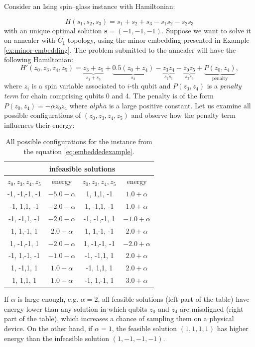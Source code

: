 \begin{example}
Consider an Ising spin--glass instance with Hamiltonian:

\begin{equation}
H(s_1, s_2, s_3) = s_1 + s_2 + s_3 - s_1s_2 - s_2s_3
\end{equation}
with an unique optimal solution $\mathbf{s} = (-1, -1, -1)$. Suppose we want to solve it on annealer
with $C_1$ topology, using the minor embedding presented in Example \ref{ex:minor-embedding}. The
problem submitted to the annealer will have the following Hamiltonian:
\begin{equation}
  H'(z_0, z_3, z_4, z_5) = \underbrace{z_3 + z_5}_{s_1 + s_3} + \underbrace{0.5(z_0 + z_4)}_{s_2} - \underbrace{z_3z_4}_{s_2s_1} - \underbrace{z_0z_5}_{s_2s_3} + \underbrace{P(z_0, z_4)}_{\text{penalty}},
  \label{eq:embeddedexample}
\end{equation}
where $z_i$ is a spin variable associated to $i$-th qubit and $P(z_0, z_4)$ is a \emph{penalty term}
for chain comprising qubits 0 and 4. The penalty is of the form $P(z_0, z_4) = -\alpha z_0z_4$ where
$alpha$ is a large positive constant. Let us examine all possible configurations of $(z_0, z_3, z_4,
z_5)$ and observe how the penalty term influences their energy:
\begin{table}[h]
\centering
\begin{tabular}{|c|c|c|c|}
\hline
\rowcolor{theader} \multicolumn{2}{|c|}{feasible solutions} & \multicolumn{2}{c|}{infeasible solutions} \\
\hline
\rowcolor{tsubheader} $z_0, z_3, z_4, z_5$ & energy & $z_0, z_3, z_4, z_5$ & energy\\
\hline
-1, -1,-1, -1 & $-5.0 -\alpha$ & 1, 1,1, -1 & $1.0 + \alpha$\\
-1, 1,1, -1 & $-2.0 -\alpha$ & 1, -1,1, -1 & $1.0 + \alpha$\\
-1, -1,1, -1 & $-2.0 -\alpha$ &-1, -1,-1, 1 & $-1.0 + \alpha$ \\
1, 1,-1, 1 & $2.0 -\alpha$ & 1, 1,-1, -1 & $2.0 + \alpha$ \\
1, -1,-1, 1 & $-2.0 -\alpha$ & 1, -1,-1, -1 & $-2.0 + \alpha$ \\
-1, 1,-1, -1 & $-1.0 -\alpha$ & -1, -1,1, 1 & $2.0 + \alpha$ \\
1, -1,1, 1 & $1.0 -\alpha$ & -1, 1,1, 1 & $2.0 + \alpha$\\
1, 1,1, 1 & $1.0  -\alpha$ & -1, 1,-1, 1 & $3.0 + \alpha$\\
\hline
\end{tabular}
\caption{All possible configurations for the instance from the equation \eqref{eq:embeddedexample}.}
\label{tab:embedded}
\end{table}

If $\alpha$ is large enough, e.g. $\alpha=2$, all feasible solutions (left part of the table) have
energy lower than any solution in which qubits $z_0$ and $z_4$ are misaligned (right part of the
table), which increases a chance of sampling them on a physical device. On the other hand, if
$\alpha=1$, the feasible solution $(1,1,1,1)$ has higher energy than the infeasible solution $(1,
-1, -1, -1)$.
\end{example}

